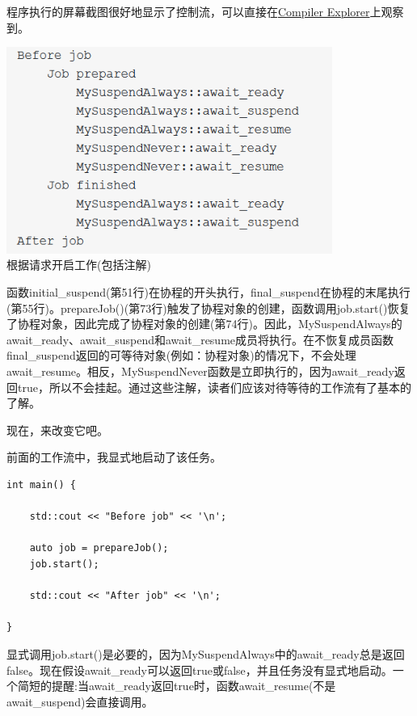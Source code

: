 程序执行的屏幕截图很好地显示了控制流，可以直接在\href{https://godbolt.org/z/T5rcE4}{Compiler Explorer}上观察到。

\begin{center}
\includegraphics[width=0.8\textwidth]{content/3/chapter7/images/19.png}\\
根据请求开启工作(包括注解)
\end{center}

函数initial\_suspend(第51行)在协程的开头执行，final\_suspend在协程的末尾执行(第55行)。prepareJob()(第73行)触发了协程对象的创建，函数调用job.start()恢复了协程对象，因此完成了协程对象的创建(第74行)。因此，MySuspendAlways的await\_ready、await\_suspend和await\_resume成员将执行。在不恢复成员函数final\_suspend返回的可等待对象(例如：协程对象)的情况下，不会处理await\_resume。相反，MySuspendNever函数是立即执行的，因为await\_ready返回true，所以不会挂起。通过这些注解，读者们应该对待等待的工作流有了基本的了解。

现在，来改变它吧。


前面的工作流中，我显式地启动了该任务。

\begin{lstlisting}[style=styleCXX]
int main() {
	
	std::cout << "Before job" << '\n';
	
	auto job = prepareJob();
	job.start();
	
	std::cout << "After job" << '\n';
	
}
\end{lstlisting}

显式调用job.start()是必要的，因为MySuspendAlways中的await\_ready总是返回false。现在假设await\_ready可以返回true或false，并且任务没有显式地启动。一个简短的提醒:当await\_ready返回true时，函数await\_resume(不是await\_suspend)会直接调用。

